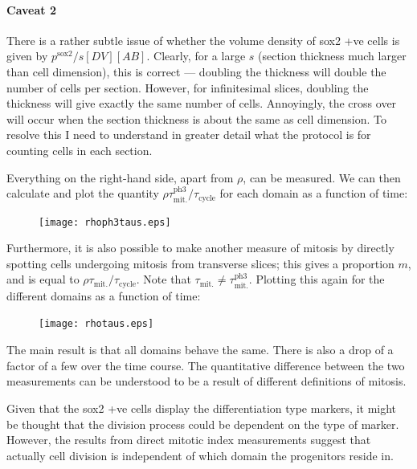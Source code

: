 \documentclass[10pt,english]{article}
\begin{document}
\paragraph{Caveat 2}

There is a rather subtle issue of whether the volume density of sox2 +ve cells
is given by $p^\textrm{sox2}/s[DV][AB]$. Clearly, for a large $s$ (section thickness
much larger than cell dimension), this is correct --- doubling the thickness
will double the number of cells per section. However, for infinitesimal slices, 
doubling the thickness will give exactly the same number of cells. Annoyingly,
the cross over will occur when the section thickness is about the same as cell
dimension. To resolve this I need to understand in greater detail what the
protocol is for counting cells in each section.

Everything on the right-hand side, apart from $\rho$, can be measured. We can
then calculate and plot the quantity $\rho \tau^\textrm{ph3}_\textrm{mit.}/\tau_\textrm{cycle}$
for each domain as a function of time:

\begin{figure}[h]
	\begin{center}
		\texttt{[image: rhoph3taus.eps]}
	\end{center}
\end{figure}

Furthermore, it is also possible to make another measure of mitosis by directly
spotting cells undergoing mitosis from transverse slices; this gives a 
proportion $m$, and is equal to $\rho \tau_\textrm{mit.}/\tau_\textrm{cycle}$.
Note that $\tau_\textrm{mit.} \neq \tau^\textrm{ph3}_\textrm{mit.}$. Plotting
this again for the different domains as a function of time:

\begin{figure}[h]
	\begin{center}
		\texttt{[image: rhotaus.eps]}
	\end{center}
\end{figure}

The main result is that all domains behave the same. There is also a drop of a 
factor of a few over the time course. The quantitative difference between the
two measurements can be understood to be a result of different definitions of
mitosis.

Given that the sox2 +ve cells display the differentiation type markers, it
might be thought that the division process could be dependent on the type of
marker. However, the results from direct mitotic index measurements suggest that actually cell division is independent of which domain the progenitors reside in.
\end{document}
